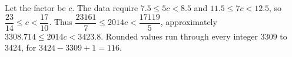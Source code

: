 Let the factor be $c$. The data require $7.5\le5c<8.5$ and $11.5\le7c<12.5$, so $\dfrac{23}{14}\le c<\dfrac{17}{10}$. Thus $\dfrac{23161}{7}\le2014c<\dfrac{17119}{5}$, approximately $3308.714\le2014c<3423.8$. Rounded values run through every integer 3309 to 3424, for $3424-3309+1=\boxed{116}$.
